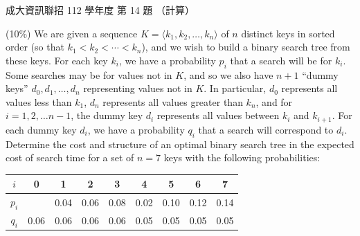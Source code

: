 \begin{pastexam}[label={px:ncku-112-prog-14}]{成大資訊聯招 112 學年度 第 14 題}
（計算）

(10\%) We are given a sequence $K=\langle k_1,k_2,\ldots,k_n\rangle$ of $n$ distinct keys in sorted order (so
that $k_1<k_2<\cdots<k_n$), and we wish to build a binary search tree from these keys. For each key $k_i$, we
have a probability $p_i$ that a search will be for $k_i$. Some searches may be for values not in $K$, and so
we also have $n+1$ ``dummy keys'' $d_0,d_1,\ldots,d_n$ representing values not in $K$. In particular, $d_0$
represents all values less than $k_1$, $d_n$ represents all values greater than $k_n$, and for
$i=1,2,\ldots n-1$, the dummy key $d_i$ represents all values between $k_i$ and $k_{i+1}$. For each dummy key
$d_i$, we have a probability $q_i$ that a search will correspond to $d_i$. Determine the cost and structure
of an optimal binary search tree in the expected cost of search time for a set of $n=7$ keys with the
following probabilities:
\begin{center}
\begin{tabular}{|c|c|c|c|c|c|c|c|c|}
\hline
$i$ & 0 & 1 & 2 & 3 & 4 & 5 & 6 & 7 \\ \hline
$p_i$ & & 0.04 & 0.06 & 0.08 & 0.02 & 0.10 & 0.12 & 0.14 \\ \hline
$q_i$ & 0.06 & 0.06 & 0.06 & 0.06 & 0.05 & 0.05 & 0.05 & 0.05 \\ \hline
\end{tabular}
\end{center}
\end{pastexam}


